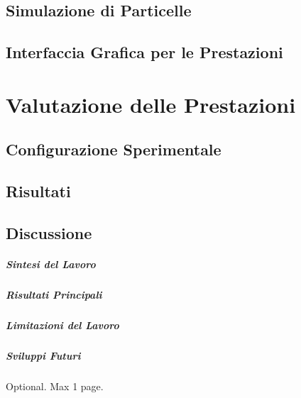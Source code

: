 \documentclass[12pt,a4paper,openright,twoside]{book}
\begin{document}
\section{Simulazione di Particelle}

\section{Interfaccia Grafica per le Prestazioni}

\chapter{Valutazione delle Prestazioni}
\label{chap:evaluation}

\section{Configurazione Sperimentale}

\section{Risultati}

\section{Discussione}

\label{chap:conclusions}

\paragraph{Sintesi del Lavoro}

\paragraph{Risultati Principali}

\paragraph{Limitazioni del Lavoro}

\paragraph{Sviluppi Futuri}

\backmatter

\nocite{*}




\begin{acknowledgements}
   Optional. Max 1 page.
\end{acknowledgements}
\end{document}
